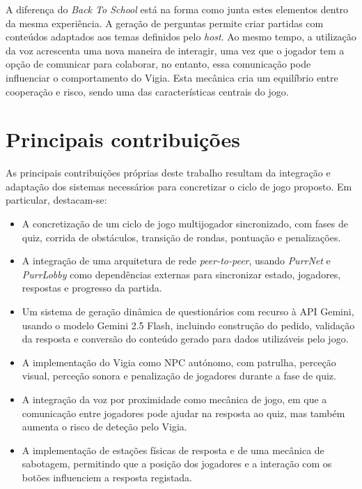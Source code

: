 A diferença do \textit{Back To School} está na forma como junta estes elementos dentro da mesma experiência. A geração de perguntas permite criar partidas com conteúdos adaptados aos temas definidos pelo \textit{host}. Ao mesmo tempo, a utilização da voz acrescenta uma nova maneira de interagir, uma vez que o jogador tem a opção de comunicar para colaborar, no entanto, essa comunicação pode influenciar o comportamento do Vigia. Esta mecânica cria um equilíbrio entre cooperação e risco, sendo uma das características centrais do jogo.


\section{Principais contribuições}
\label{sec:contribuicoes}

As principais contribuições próprias deste trabalho resultam da integração e adaptação dos sistemas necessários para concretizar o ciclo de jogo proposto. Em particular, destacam-se:

\begin{itemize}
   \item A concretização de um ciclo de jogo multijogador sincronizado, com fases de quiz, corrida de obstáculos, transição de rondas, pontuação e penalizações.
   \item A integração de uma arquitetura de rede \textit{peer-to-peer}, usando \textit{PurrNet} e \textit{PurrLobby} como dependências externas para sincronizar estado, jogadores, respostas e progresso da partida.
   \item Um sistema de geração dinâmica de questionários com recurso à API Gemini, usando o modelo Gemini 2.5 Flash, incluindo construção do pedido, validação da resposta e conversão do conteúdo gerado para dados utilizáveis pelo jogo.
   \item A implementação do Vigia como NPC autónomo, com patrulha, perceção visual, perceção sonora e penalização de jogadores durante a fase de quiz.
   \item A integração da voz por proximidade como mecânica de jogo, em que a comunicação entre jogadores pode ajudar na resposta ao quiz, mas também aumenta o risco de deteção pelo Vigia.
   \item A implementação de estações físicas de resposta e de uma mecânica de sabotagem, permitindo que a posição dos jogadores e a interação com os botões influenciem a resposta registada.
\end{itemize}


